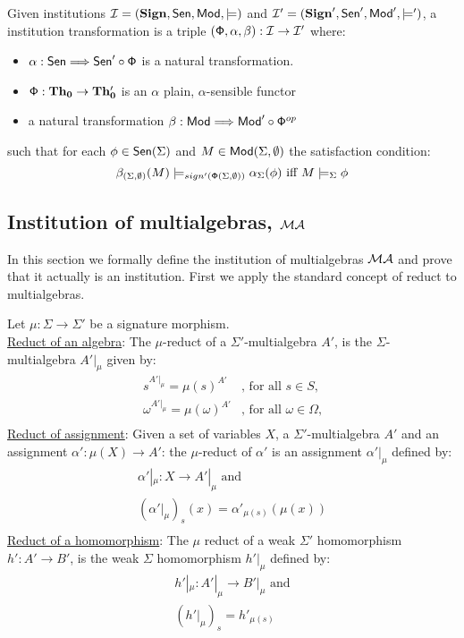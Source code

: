 \documentclass[10pt]{article}
\begin{document}
\begin{definition}
Given institutions ${\mathcal{I}}= ({{\bf Sign}},{\sf {Sen}},{\sf {Mod}},\models)$ and
${\mathcal{I'}}=({{\bf Sign}'},{\sf {Sen}}',{\sf {Mod}}',\models')$, 
a institution transformation is a triple  $({\sf {\Phi}},\alpha,\beta): {\mathcal{I}} \to {\mathcal{I'}}$ where:
\begin{itemize}
	\item $\alpha: {\sf {Sen}} \mathrel{\Longrightarrow} {\sf {Sen}}' \circ {\sf {\Phi}}$ is a natural transformation.
	\item ${\sf {\Phi}}: {\bf Th_0} \to {\bf Th_0'}$ is an $\alpha$ plain, $\alpha$-sensible functor %
\item a natural transformation $\beta: {\sf {Mod}} \mathrel{\Longrightarrow} {\sf {Mod}}' \circ {\sf {\Phi}}^{op}$
\end{itemize}
such that for each $\phi \in {\sf {Sen}}(\Sigma)$ and $ M \in {\sf {Mod}}(\Sigma,\emptyset)$ the satisfaction condition:
\[ \beta_{(\Sigma,\emptyset)}(M) \models_{sign'({\sf {\Phi}}(\Sigma,\emptyset))} \alpha_{\Sigma}(\phi) \mbox{ iff } M \models_{\Sigma} \phi \]
\end{definition}

\subsection{Institution of multialgebras, ${\mathcal{MA}}$}
\label{sec:multi}
In this section we formally define the institution of multialgebras  ${\mathcal{MA}}$ and prove
that it actually is an institution.  First we apply
the standard concept of reduct to multialgebras.
\begin{definition}
Let $\mu: \Sigma \to \Sigma'$ be a signature morphism.\\
\underline{Reduct of an algebra}: The $\mu$-reduct
of a $\Sigma'$-multialgebra $A'$, is the $\Sigma$-multialgebra $A'|_\mu$
given by:
\[ \begin{array}{ll} 
	s^{{A'}|_\mu} = \mu(s)^{A'} 		&\mbox{, for all $s \in S$,} \\
 	\omega^{{A'}|_\mu} = \mu(\omega)^{A'} 	&\mbox{, for all $\omega \in \Omega$,}\\
\end{array} \]
%
\underline{Reduct of assignment}:
Given a set of variables $X$, a $\Sigma'$-multialgebra $A'$ 
and an assignment $\alpha': \mu(X) \to A'$:
the $\mu$-reduct of $\alpha'$ is an assignment
$\alpha' |_\mu$ defined by:
\[	\begin{array}{l}
	\alpha' |_\mu : X \to A' |_\mu \mbox{ and}\\  
	(\alpha' |_\mu)_{s}(x) = \alpha'_{\mu(s)}(\mu(x))\\
	\end{array}
\]
%
\underline{Reduct of a homomorphism}: The $\mu$ reduct of a weak $\Sigma'$ homomorphism
$h':A' \to B'$, is the weak $\Sigma$ homomorphism $h'|_\mu$ defined by:
\[ \begin{array}{l} 
	h'|_\mu : A'|_\mu \to  B'|_\mu \mbox{ and}\\
 	(h'|_\mu)_s = h'_{\mu(s)}\\
\end{array} \]
\end{definition}
\end{document}
